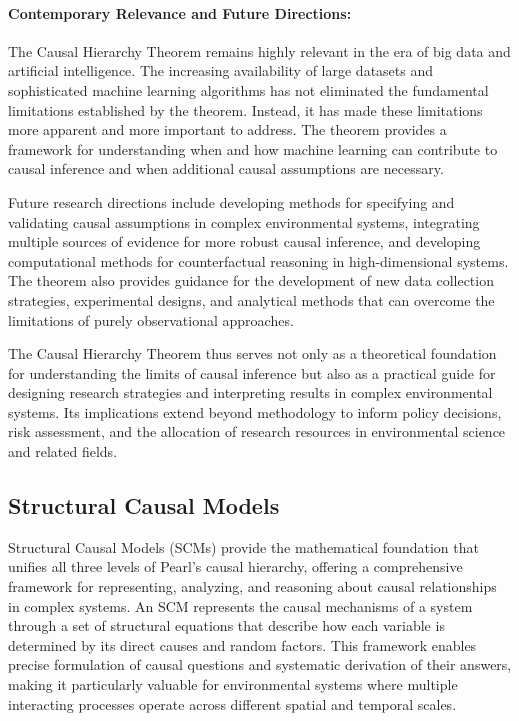 \paragraph{Contemporary Relevance and Future Directions:}

The Causal Hierarchy Theorem remains highly relevant in the era of big data and artificial intelligence. The increasing availability of large datasets and sophisticated machine learning algorithms has not eliminated the fundamental limitations established by the theorem. Instead, it has made these limitations more apparent and more important to address. The theorem provides a framework for understanding when and how machine learning can contribute to causal inference and when additional causal assumptions are necessary.

Future research directions include developing methods for specifying and validating causal assumptions in complex environmental systems, integrating multiple sources of evidence for more robust causal inference, and developing computational methods for counterfactual reasoning in high-dimensional systems. The theorem also provides guidance for the development of new data collection strategies, experimental designs, and analytical methods that can overcome the limitations of purely observational approaches.

The Causal Hierarchy Theorem thus serves not only as a theoretical foundation for understanding the limits of causal inference but also as a practical guide for designing research strategies and interpreting results in complex environmental systems. Its implications extend beyond methodology to inform policy decisions, risk assessment, and the allocation of research resources in environmental science and related fields.

\subsection{Structural Causal Models}

Structural Causal Models (SCMs) provide the mathematical foundation that unifies all three levels of Pearl's causal hierarchy, offering a comprehensive framework for representing, analyzing, and reasoning about causal relationships in complex systems. An SCM represents the causal mechanisms of a system through a set of structural equations that describe how each variable is determined by its direct causes and random factors. This framework enables precise formulation of causal questions and systematic derivation of their answers, making it particularly valuable for environmental systems where multiple interacting processes operate across different spatial and temporal scales.

